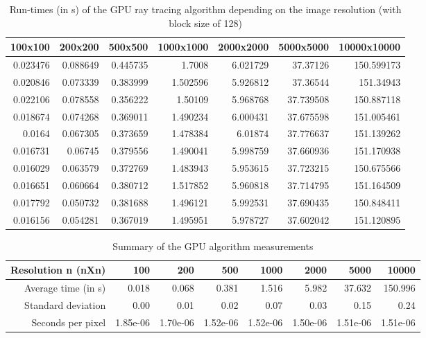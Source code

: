 \begin{table}[ht]
\centering
\caption{Run-times (in s) of the GPU ray tracing algorithm depending on the image resolution (with block size of 128)}
\begin{tabular}{|r|r|r|r|r|r|r|}
100x100 & 200x200 & 500x500 & 1000x1000 & 2000x2000 & 5000x5000 & 10000x10000 \\
\hline
0.023476 & 0.088649 & 0.445735 & 1.7008 & 6.021729 & 37.37126 & 150.599173 \\
0.020846 & 0.073339 & 0.383999 & 1.502596 & 5.926812 & 37.36544 & 151.34943 \\
0.022106 & 0.078558 & 0.356222 & 1.50109 & 5.968768 & 37.739508 & 150.887118 \\
0.018674 & 0.074268 & 0.369011 & 1.490234 & 6.000431 & 37.675598 & 151.005461 \\
0.0164 & 0.067305 & 0.373659 & 1.478384 & 6.01874 & 37.776637 & 151.139262 \\
0.016731 & 0.06745 & 0.379556 & 1.490041 & 5.998759 & 37.660936 & 151.170938 \\
0.016029 & 0.063579 & 0.372769 & 1.483943 & 5.953615 & 37.723215 & 150.675566 \\
0.016651 & 0.060664 & 0.380712 & 1.517852 & 5.960818 & 37.714795 & 151.164509 \\
0.017792 & 0.050732 & 0.381688 & 1.496121 & 5.992531 & 37.690435 & 150.848411 \\
0.016156 & 0.054281 & 0.367019 & 1.495951 & 5.978727 & 37.602042 & 151.120895 \\
\end{tabular}
\end{table}

\begin{table}[ht]
\centering
\caption{Summary of the GPU algorithm measurements}
\begin{tabular}{|r|r|r|r|r|r|r|r|}
Resolution n (nXn)& 100 & 200 & 500 & 1000 & 2000 & 5000 & 10000 \\
\hline
Average time (in s) & 0.018 & 0.068 & 0.381 & 1.516 & 5.982 & 37.632 & 150.996 \\
Standard deviation & 0.00 & 0.01 & 0.02 & 0.07 & 0.03 & 0.15 & 0.24 \\
Seconds per pixel & 1.85e-06 & 1.70e-06 & 1.52e-06 & 1.52e-06 & 1.50e-06 & 1.51e-06 & 1.51e-06 \\
\end{tabular}
\end{table}

